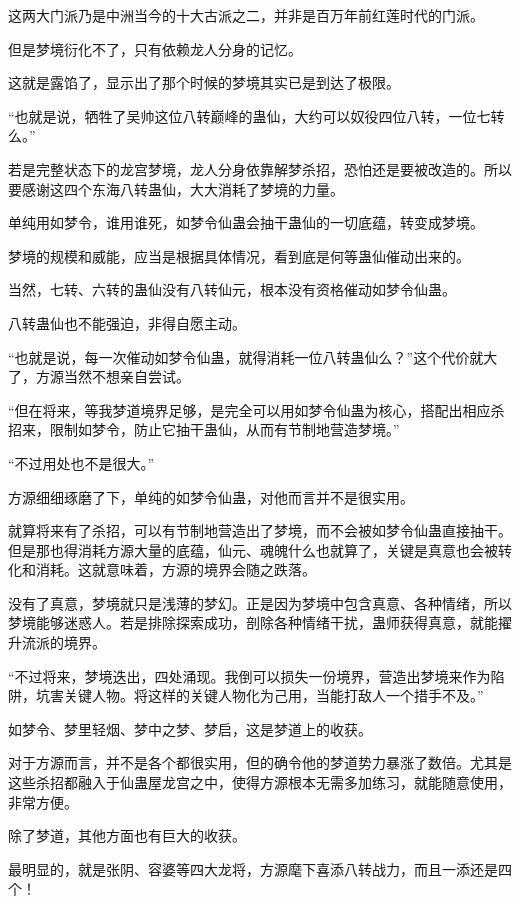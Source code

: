 \begin{this_body}
这两大门派乃是中洲当今的十大古派之二，并非是百万年前红莲时代的门派。

但是梦境衍化不了，只有依赖龙人分身的记忆。

这就是露馅了，显示出了那个时候的梦境其实已是到达了极限。

“也就是说，牺牲了吴帅这位八转巅峰的蛊仙，大约可以奴役四位八转，一位七转么。”

若是完整状态下的龙宫梦境，龙人分身依靠解梦杀招，恐怕还是要被改造的。所以要感谢这四个东海八转蛊仙，大大消耗了梦境的力量。

单纯用如梦令，谁用谁死，如梦令仙蛊会抽干蛊仙的一切底蕴，转变成梦境。

梦境的规模和威能，应当是根据具体情况，看到底是何等蛊仙催动出来的。

当然，七转、六转的蛊仙没有八转仙元，根本没有资格催动如梦令仙蛊。

八转蛊仙也不能强迫，非得自愿主动。

“也就是说，每一次催动如梦令仙蛊，就得消耗一位八转蛊仙么？”这个代价就大了，方源当然不想亲自尝试。

“但在将来，等我梦道境界足够，是完全可以用如梦令仙蛊为核心，搭配出相应杀招来，限制如梦令，防止它抽干蛊仙，从而有节制地营造梦境。”

“不过用处也不是很大。”

方源细细琢磨了下，单纯的如梦令仙蛊，对他而言并不是很实用。

就算将来有了杀招，可以有节制地营造出了梦境，而不会被如梦令仙蛊直接抽干。但是那也得消耗方源大量的底蕴，仙元、魂魄什么也就算了，关键是真意也会被转化和消耗。这就意味着，方源的境界会随之跌落。

没有了真意，梦境就只是浅薄的梦幻。正是因为梦境中包含真意、各种情绪，所以梦境能够迷惑人。若是排除探索成功，剖除各种情绪干扰，蛊师获得真意，就能擢升流派的境界。

“不过将来，梦境迭出，四处涌现。我倒可以损失一份境界，营造出梦境来作为陷阱，坑害关键人物。将这样的关键人物化为己用，当能打敌人一个措手不及。”

如梦令、梦里轻烟、梦中之梦、梦启，这是梦道上的收获。

对于方源而言，并不是各个都很实用，但的确令他的梦道势力暴涨了数倍。尤其是这些杀招都融入于仙蛊屋龙宫之中，使得方源根本无需多加练习，就能随意使用，非常方便。

除了梦道，其他方面也有巨大的收获。

最明显的，就是张阴、容婆等四大龙将，方源麾下喜添八转战力，而且一添还是四个！


\end{this_body}
